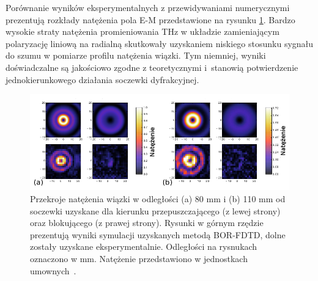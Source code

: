 Porównanie wyników eksperymentalnych z przewidywaniami numerycznymi prezentują rozkłady natężenia pola E-M przedstawione na rysunku \ref{fig:eksp-por}. Bardzo wysokie straty natężenia promieniowania THz w układzie zamieniającym polaryzację liniową na radialną skutkowały uzyskaniem niskiego stosunku sygnału do szumu w pomiarze profilu natężenia wiązki. Tym niemniej, wyniki doświadczalne są jakościowo zgodne z teoretycznymi i~stanowią potwierdzenie jednokierunkowego działania soczewki dyfrakcyjnej.

\begin{figure}
	\includegraphics[width=\textwidth]{images/thz/exp-express.png}
	\caption{Przekroje natężenia wiązki w odległości (a) 80 mm i (b) 110 mm od soczewki uzyskane dla kierunku przepuszczającego (z lewej strony) oraz blokującego (z prawej strony). Rysunki w górnym rzędzie prezentują wyniki symulacji uzyskanych metodą BOR-FDTD, dolne zostały uzyskane eksperymentalnie. Odległości na rysnukach oznaczono w mm. Natężenie przedstawiono w jednostkach umownych~\cite{Yavorskiy:14}.}
	\label{fig:eksp-por}
\end{figure}
